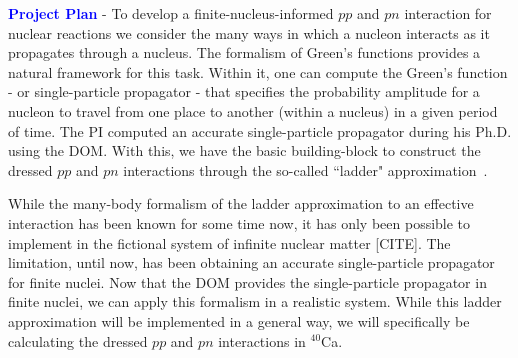 \documentclass[12pt]{article}
\begin{document}
\textcolor{blue}{\textbf{Project Plan}}
 - To develop a finite-nucleus-informed $pp$ and $pn$ interaction for nuclear reactions we consider the many ways in which a nucleon interacts as it propagates through a
nucleus. 
The formalism of Green's functions provides a natural framework for this task. Within it, one can compute the Green's function - or single-particle propagator - that specifies the
probability amplitude for a nucleon to travel from one place to another (within a nucleus) in a given period of time. The PI computed an accurate single-particle propagator during
his Ph.D. using the DOM. 
With this, we have the
basic building-block to construct the dressed $pp$ and $pn$ interactions through the so-called ``ladder" approximation~\cite{Exposed!}. 

   
While the many-body formalism of the ladder approximation to an effective interaction has been known for some time now, it has only
been possible to implement in the fictional system of infinite nuclear matter [CITE]. The limitation, until now, has been
obtaining an accurate single-particle propagator for finite nuclei. Now that the DOM provides the single-particle propagator
in finite nuclei, we can apply this formalism in a realistic system. 
While this ladder approximation
will be implemented in a general way, we will specifically be calculating the dressed $pp$ and $pn$ interactions in $^{40}$Ca. 
\end{document}
